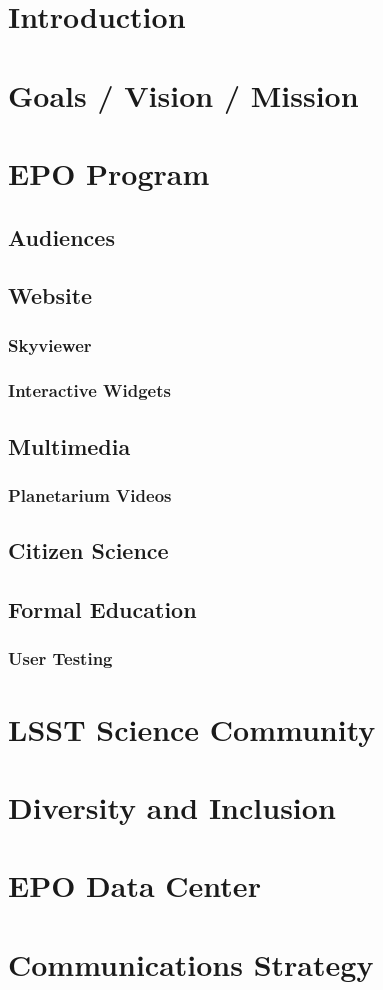 \section{Introduction}

\section{Goals / Vision / Mission}

\section{EPO Program}
\subsection{Audiences}
\subsection{Website}
\subsubsection{Skyviewer}
\subsubsection{Interactive Widgets}
\subsection{Multimedia}
\subsubsection{Planetarium Videos}
\subsection{Citizen Science}
\subsection{Formal Education}
\subsubsection{User Testing}

\section{LSST Science Community}

\section{Diversity and Inclusion}

\section{EPO Data Center}

\section{Communications Strategy}

